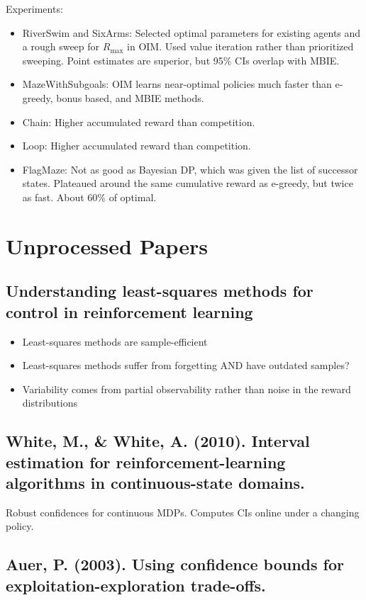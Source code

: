 \documentclass[12pt, oneside]{amsart}
\begin{document}
Experiments:
\begin{itemize}
	\item RiverSwim and SixArms: Selected optimal parameters for existing agents and a rough sweep for $R_{\text{max}}$ in OIM. Used value iteration rather than prioritized sweeping. Point estimates are superior, but 95\% CIs overlap with MBIE.
	\item MazeWithSubgoals: OIM learns near-optimal policies much faster than e-greedy, bonus based, and MBIE methods.
	\item Chain: Higher accumulated reward than competition.
	\item Loop: Higher accumulated reward than competition.
	\item FlagMaze: Not as good as Bayesian DP, which was given the list of successor states. Plateaued around the same cumulative reward as e-greedy, but twice as fast. About 60\% of optimal.
\end{itemize}

\section*{Unprocessed Papers}
\subsection*{Understanding least-squares methods for control in reinforcement learning}

\begin{itemize}
	\item Least-squares methods are sample-efficient
	\item Least-squares methods suffer from forgetting AND have outdated samples?
	\item Variability comes from partial observability rather than noise in the reward distributions
\end{itemize}

\subsection*{White, M., \& White, A. (2010). Interval estimation for reinforcement-learning algorithms in continuous-state domains.}
Robust confidences for continuous MDPs. Computes CIs online under a changing policy.
\subsection*{Auer, P. (2003). Using confidence bounds for exploitation-exploration trade-offs.}
\end{document}
